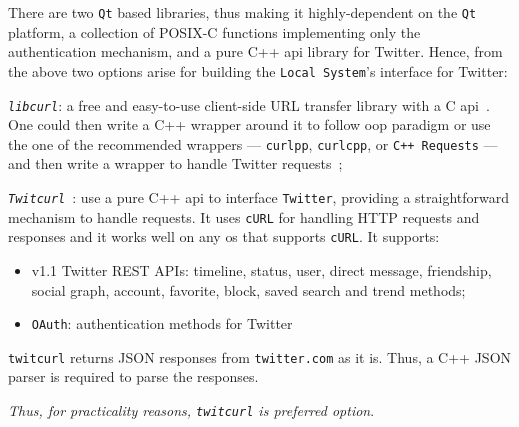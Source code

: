 There are two \texttt{Qt} based libraries, thus making it
highly-dependent on the \texttt{Qt} platform, a collection of POSIX-C functions
implementing only the authentication mechanism, and a pure C++ \gls{api} library
for Twitter. Hence, from the above two options arise for building the
\texttt{Local System}'s interface for Twitter:
\begin{enum-c}
\item \emph{\texttt{libcurl}}: a free and easy-to-use client-side URL transfer library
  with a C \gls{api}~\cite{libcurl}. One could then write a C++ wrapper around it to follow
  \gls{oop} paradigm or use the one of the recommended wrappers ---
  \texttt{curlpp}, \texttt{curlcpp}, or \texttt{C++ Requests} --- and then write
  a wrapper to handle Twitter requests~\cite{libcurlBindings};
\item \emph{\texttt{Twitcurl}}~\cite{twitcurlGithub}: use a pure C++ \gls{api} to interface \texttt{Twitter},
  providing a straightforward mechanism to handle requests. It uses
  \texttt{cURL} for handling HTTP requests and responses and it works well on
  any \gls{os} that supports \texttt{cURL}. It supports:
  \begin{itemize}
  \item v1.1 Twitter REST APIs: timeline, status, user, direct message,
    friendship, social graph, account, favorite, block, saved search and trend
    methods;
  \item \texttt{OAuth}: authentication methods for Twitter
  \end{itemize}
  \texttt{twitcurl} returns JSON responses from \texttt{twitter.com} as it
  is. Thus, a C++ JSON parser is required to parse the responses.
\end{enum-c}

\emph{Thus, for practicality reasons, \texttt{twitcurl} is preferred option}.